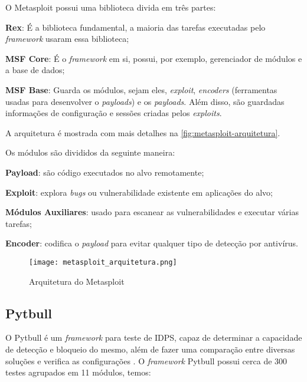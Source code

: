 O Metasploit possui uma biblioteca divida em três partes:

\begin{alineas}
\item \textbf{Rex}: É a biblioteca fundamental, a maioria das tarefas executadas pelo \textit{framework} usaram essa biblioteca; 
\item \textbf{MSF Core}: É o \textit{framework} em si, possui, por exemplo, gerenciador de módulos e a base de dados; 
\item \textbf{MSF Base}: Guarda os módulos, sejam eles, \textit{exploit}, \textit{encoders} (ferramentas usadas para desenvolver o \textit{payloads}) e os \textit{payloads}. Além disso, são guardadas informações de configuração e sessões criadas pelos \textit{exploits}. 
\end{alineas}

A arquitetura é mostrada com mais detalhes na \autoref{fig:metasploit-arquitetura}. 

Os módulos são divididos da seguinte maneira: 

\begin{alineas}
\item \textbf{Payload}: são código executados no alvo remotamente; 
\item \textbf{Exploit}: explora \textit{bugs} ou vulnerabilidade existente em aplicações do alvo; 
\item \textbf{Módulos Auxiliares}: usado para escanear as vulnerabilidades e executar várias tarefas; 
\item \textbf{Encoder}: codifica o \textit{payload} para evitar qualquer tipo de detecção por antivírus.
\end{alineas}

 \begin{figure}[!htb]
  \centering
  \caption{Arquitetura do Metasploit}
  \texttt{[image: metasploit\_arquitetura.png]}
  \label{fig:metasploit-arquitetura}
 \end{figure}

 \subsection{Pytbull} \label{sec:pytbull}

 O Pytbull é um \textit{framework} para teste de IDPS, capaz de determinar a capacidade de detecção e bloqueio do mesmo, além de fazer uma comparação entre diversas soluções e verifica as configurações \cite{pytbull}. O \textit{framework} Pytbull possui cerca de 300 testes agrupados em 11 módulos, temos:

